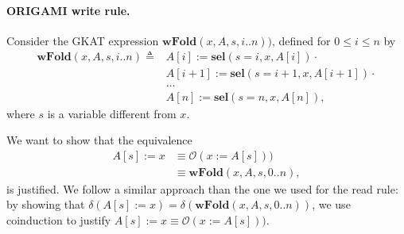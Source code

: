 \paragraph{ORIGAMI write rule.} 
Consider the GKAT expression $\textbf{wFold}(x,A,s,i..n))$, defined for $0\leq i\leq n$ by
\begin{align*}
    \textbf{wFold}(x,A,s,i..n)\triangleq
    &A[i]:=\textbf{sel}(s=i,x,A[i])\cdot\\
    &A[i+1]:=\textbf{sel}(s=i+1,x,A[i+1])\cdot\\
    &\ldots\\
    &A[n]:=\textbf{sel}(s=n,x,A[n]),
\end{align*}
where $s$ is a variable different from $x$.

We want to show that the equivalence
\begin{align*}
    A[s]:=x&\equiv \mathscr{O}(x:=A[s]))\\
    &\equiv \textbf{wFold}(x,A,s,0..n),
\end{align*}
is justified. We follow a similar approach than the one we used for the read rule: by showing that 
$\delta(A[s]:=x)=\delta(\textbf{wFold}(x,A,s,0..n))$, we use coinduction to justify $A[s]:=x\equiv \mathscr{O}(x:=A[s]))$.

